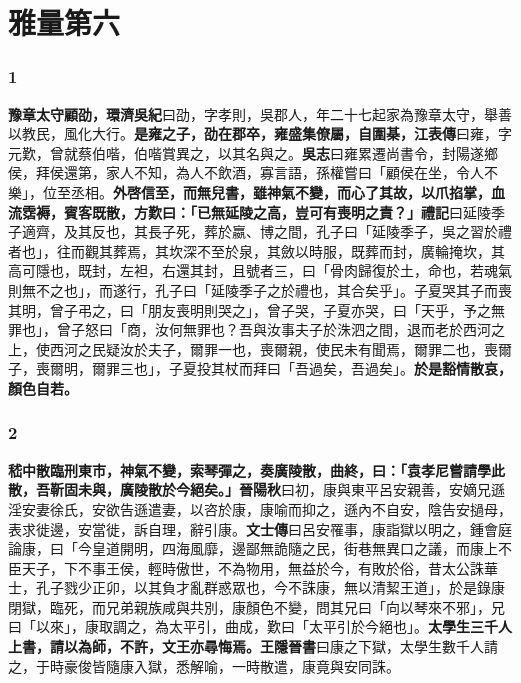 \chapter{雅量第六}

\subsection*{1}

\textbf{豫章太守顧劭，}{\footnotesize \textbf{環濟吳紀}曰劭，字孝則，吳郡人，年二十七起家為豫章太守，舉善以教民，風化大行。}\textbf{是雍之子，劭在郡卒，雍盛集僚屬，自圍棊，}{\footnotesize \textbf{江表傳}曰雍，字元歎，曾就蔡伯喈，伯喈賞異之，以其名與之。\textbf{吳志}曰雍累遷尚書令，封陽遂鄉侯，拜侯還第，家人不知，為人不飲酒，寡言語，孫權嘗曰「顧侯在坐，令人不樂」，位至丞相。}\textbf{外啓信至，而無兒書，雖神氣不變，而心了其故，以爪掐掌，血流霑褥，賓客既散，方歎曰：「已無延陵之高，豈可有喪明之責？」}{\footnotesize \textbf{禮記}曰延陵季子適齊，及其反也，其長子死，葬於嬴、博之間，孔子曰「延陵季子，吳之習於禮者也」，往而觀其葬焉，其坎深不至於泉，其斂以時服，既葬而封，廣輪掩坎，其高可隱也，既封，左袒，右還其封，且號者三，曰「骨肉歸復於土，命也，若魂氣則無不之也」，而遂行，孔子曰「延陵季子之於禮也，其合矣乎」。子夏哭其子而喪其明，曾子弔之，曰「朋友喪明則哭之」，曾子哭，子夏亦哭，曰「天乎，予之無罪也」，曾子怒曰「商，汝何無罪也？吾與汝事夫子於洙泗之間，退而老於西河之上，使西河之民疑汝於夫子，爾罪一也，喪爾親，使民未有聞焉，爾罪二也，喪爾子，喪爾明，爾罪三也」，子夏投其杖而拜曰「吾過矣，吾過矣」。}\textbf{於是豁情散哀，顏色自若。}

\subsection*{2}

\textbf{嵇中散臨刑東市，神氣不變，索琴彈之，奏廣陵散，曲終，曰：「袁孝尼嘗請學此散，吾靳固未與，廣陵散於今絕矣。」}{\footnotesize \textbf{晉陽秋}曰初，康與東平呂安親善，安嫡兄遜淫安妻徐氏，安欲告遜遣妻，以咨於康，康喻而抑之，遜內不自安，陰告安撾母，表求徙邊，安當徙，訴自理，辭引康。\textbf{文士傳}曰呂安罹事，康詣獄以明之，鍾會庭論康，曰「今皇道開明，四海風靡，邊鄙無詭隨之民，街巷無異口之議，而康上不臣天子，下不事王侯，輕時傲世，不為物用，無益於今，有敗於俗，昔太公誅華士，孔子戮少正卯，以其負才亂群惑眾也，今不誅康，無以清絜王道」，於是錄康閉獄，臨死，而兄弟親族咸與共別，康顏色不變，問其兄曰「向以琴來不邪」，兄曰「以來」，康取調之，為太平引，曲成，歎曰「太平引於今絕也」。}\textbf{太學生三千人上書，請以為師，不許，文王亦尋悔焉。}{\footnotesize \textbf{王隱晉書}曰康之下獄，太學生數千人請之，于時豪俊皆隨康入獄，悉解喻，一時散遣，康竟與安同誅。}

